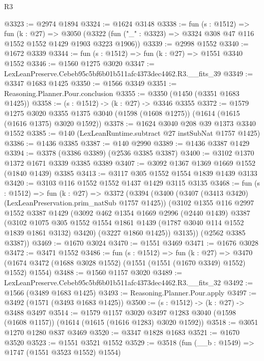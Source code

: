 \begin{lexlean}{R3}
\begin{coremodule}
@3323 := @2974 @1894
@3324 := @1624 @3148
@3338 := fun (s : @1512) =>
  fun (k : @27) =>
  @3050 (@3322 (fun ("_" : @3323) => @3324 @308 @47 @116 @1552 @1552 @1429 @1903 @3223 @1906))
@3339 := @2998 @1552
@3340 := @1672 @3339
@3344 := fun (s : @1512) => fun (k : @27) => @1551 @3340 @1552
@3346 := @1560 @1275 @3020
@3347 := LexLeanPreserve.Cebeb95c5bf6b01b511afc4373dec4462.R3.__fits_39
@3349 := @3347 @1683 @1425
@3350 := @1566 @3349
@3351 := Reasoning.Planner.Pour.conclusion
@3355 := @3350 (@1450 (@3351 @1683 @1425))
@3358 := (s : @1512) -> (k : @27) -> @3346 @3355
@3372 := @1579
    @1275
    @3020
    @3355
    @1375
    @3040
    (@1598 (@1608 @1275))
    (@1614 (@1615 (@1616 @1375) @3020 @1592))
@3378 := @1624 @3040 @208 @39 @1373 @3340 @1552
@3385 := @140 (LexLeanRuntime.subtract @27 instSubNat @1757 @1425)
@3386 := @1436 @3385
@3387 := @140 @2990
@3389 := @1436 @3387 @1429
@3394 := @3378 (@3386 @3389) (@2536 @3385 @3387)
@3400 := @3102 @1370 @1372 @1671 @3339 @3385 @3389
@3407 := @3092 @1367 @1369 @1669 @1552 (@1840 @1439) @3385
@3413 := @3117 @305 @1552 @1554 @1839 @1439 @3133
@3420 := @3103 @116 @1552 @1552 @1437 @1429 @3115 @3135
@3468 := fun (s : @1512) =>
  fun (k : @27) =>
  @3372
    (@3394
      (@3400
        (@3407 (@3413 @3420) (LexLeanPreservation.prim_natSub @1757 @1425))
        (@3102
          @1355
          @116
          @2997
          @1552
          @3387
          @1429
          (@3092
            @462
            @1354
            @1669
            @2996
            (@2440 @1439)
            @3387
            (@3102
              @1075
              @305
              @1552
              @1554
              @1861
              @1439
              (@1787 @3040 @114 @1552 @1839 @1861 @3132)
              @3420)
            (@3227 @1860 @1425))
          @3135))
      (@2562 @3385 @3387))
@3469 := @1670 @3024
@3470 := @1551 @3469
@3471 := @1676 @3028
@3472 := @3471 @1552
@3486 := fun (s : @1512) =>
  fun (k : @27) =>
  @3470 (@1674 @3472 (@1688 @3028 @1552) (@1551 (@1551 (@1670 @3349) @1552) @1552) @1554)
@3488 := @1560 @1157 @3020
@3489 := LexLeanPreserve.Cebeb95c5bf6b01b511afc4373dec4462.R3.__fits_32
@3492 := @1566 (@3489 @1683 @1425)
@3493 := Reasoning.Planner.Pour.apply
@3497 := @3492 (@1571 (@3493 @1683 @1425))
@3500 := (s : @1512) -> (k : @27) -> @3488 @3497
@3514 := @1579
    @1157
    @3020
    @3497
    @1283
    @3040
    (@1598 (@1608 @1157))
    (@1614 (@1615 (@1616 @1283) @3020 @1592))
@3518 := @3051 @1270 @1280 @837 @3469
@3520 := @3347 @1828 @1683
@3521 := @1670 @3520
@3523 := @1551 @3521 @1552
@3529 := @3518 (fun (__b : @1549) => @1747 (@1551 @3523 @1552) @1554)

\end{coremodule}
\end{lexlean}
